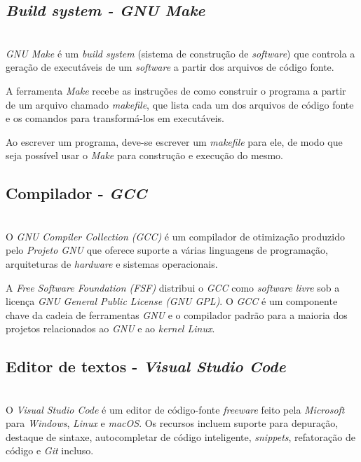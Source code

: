 \documentclass[times, twoside, watermark]{artigo}
\begin{document}
\subsection{\textit{Build system - GNU Make}}\hfill\\

\textit{GNU Make} é um \textit{build system} (sistema de construção de 
\textit{software}) que controla a geração de executáveis de um \textit{software}
a partir dos arquivos de código fonte.

A ferramenta \textit{Make} recebe as instruções de como construir o programa a partir 
de um arquivo chamado \textit{makefile}, que lista cada um dos arquivos de código 
fonte e os comandos para transformá-los em executáveis. 

Ao escrever um programa, deve-se escrever um \textit{makefile} para ele, de modo 
que seja possível usar o \textit{Make} para construção e execução do mesmo.
\cite{gnumake}

\subsection{Compilador - \textit{GCC}}\hfill\\

O \textit{GNU Compiler Collection (GCC)} é um compilador de otimização produzido pelo 
\textit{Projeto GNU} que oferece suporte a várias linguagens de programação, 
arquiteturas de \textit{hardware} e sistemas operacionais. 

A \textit{Free Software Foundation (FSF)} distribui o \textit{GCC} como 
\textit{software livre} sob a licença \textit{GNU General Public License (GNU GPL)}.
O \textit{GCC} é um componente chave da cadeia de ferramentas \textit{GNU} e o 
compilador padrão para a maioria dos projetos relacionados ao \textit{GNU} e ao 
\textit{kernel Linux}.\cite{gcc}


\subsection{Editor de textos - \textit{Visual Studio Code}}\hfill\\

O \textit{Visual Studio Code} é um editor de código-fonte \textit{freeware} feito 
pela \textit{Microsoft} para \textit{Windows}, \textit{Linux} e \textit{macOS}. Os 
recursos incluem suporte para depuração, destaque de sintaxe, autocompletar de código 
inteligente, \textit{snippets}, refatoração de código e \textit{Git}
incluso.\cite{vscode}
\end{document}
